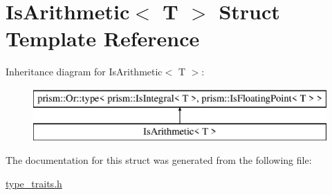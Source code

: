 \hypertarget{struct_is_arithmetic}{}\section{Is\+Arithmetic$<$ T $>$ Struct Template Reference}
\label{struct_is_arithmetic}
Inheritance diagram for Is\+Arithmetic$<$ T $>$\+:\begin{figure}[H]
\begin{center}
\leavevmode
\includegraphics[height=2.000000cm]{struct_is_arithmetic}
\end{center}
\end{figure}


The documentation for this struct was generated from the following file\+:\begin{DoxyCompactItemize}
\item 
\hyperlink{type__traits_8h}{type\+\_\+traits.\+h}\end{DoxyCompactItemize}
